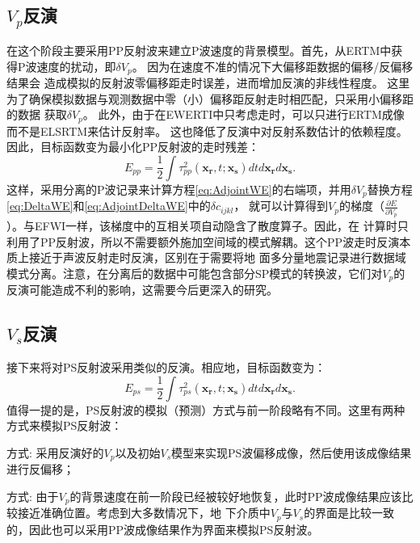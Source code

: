 \subsection{$V_p$反演}
在这个阶段主要采用PP反射波来建立P波速度的背景模型。首先，从ERTM中获得P波速度的扰动，即$\delta V_p$。
因为在速度不准的情况下大偏移距数据的偏移/反偏移结果会
造成模拟的反射波零偏移距走时误差，进而增加反演的非线性程度。
这里为了确保模拟数据与观测数据中零（小）偏移距反射走时相匹配，只采用小偏移距的数据
获取$\delta V_p$。
此外，由于在EWERTI中只考虑走时，可以只进行ERTM成像
而不是ELSRTM来估计反射率。
这也降低了反演中对反射系数估计的依赖程度。因此，目标函数变为最小化PP反射波的走时残差：
\begin{equation}
    E_{pp}=\frac{1}{2}\int\tau^2_{pp}(\mathbf{x_r},t;\mathbf{x_s})dtd\mathbf{x_r}d\mathbf{x_s}.
    \label{eq:ObjectivefunctionPP} 
\end{equation}
这样，采用分离的P波记录来计算方程\eqref{eq:AdjointWE}的右端项，并用$\delta V_p$替换方程\eqref{eq:DeltaWE}和\eqref{eq:AdjointDeltaWE}中的$\delta c_{ijkl}$，
就可以计算得到$V_p$的梯度（$\frac{\partial E}{\partial V_p}$）。与EFWI一样，该梯度中的互相关项自动隐含了散度算子。因此，在
计算时只利用了PP反射波，所以不需要额外施加空间域的模式解耦。这个PP波走时反演本质上接近于声波反射走时反演，区别在于需要将地
面多分量地震记录进行数据域模式分离。注意，在分离后的数据中可能包含部分SP模式的转换波，它们对$V_p$的反演可能造成不利的影响，这需要今后更深入的研究。

\subsection{$V_s$反演}
接下来将对PS反射波采用类似的反演。相应地，目标函数变为：
\begin{equation}
    E_{ps}=\frac{1}{2}\int\tau^2_{ps}(\mathbf{x_r},t;\mathbf{x_s})dtd\mathbf{x_r}d\mathbf{x_s}.
    \label{eq:ObjectivefunctionPS} 
\end{equation}
值得一提的是，PS反射波的模拟（预测）方式与前一阶段略有不同。这里有两种方式来模拟PS反射波：

方式\uppercase\expandafter{}: 采用反演好的$V_p$以及初始$V_s$模型来实现PS波偏移成像，然后使用该成像结果进行反偏移；

方式\uppercase\expandafter{}: 由于$V_p$的背景速度在前一阶段已经被较好地恢复，此时PP波成像结果应该比较接近准确位置。考虑到大多数情况下，地
下介质中$V_p$与$V_s$的界面是比较一致的，因此也可以采用PP波成像结果作为界面来模拟PS反射波。

